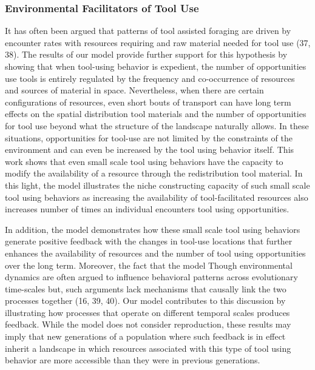 \documentclass[9pt,twocolumn,twoside,]{pnas-new}
\begin{document}
\hypertarget{environmental-facilitators-of-tool-use}{%
\subsubsection{Environmental Facilitators of Tool
Use}\label{environmental-facilitators-of-tool-use}}

It has often been argued that patterns of tool assisted foraging are
driven by encounter rates with resources requiring and raw material
needed for tool use (37, 38). The results of our model provide further
support for this hypothesis by showing that when tool-using behavior is
expedient, the number of opportunities use tools is entirely regulated
by the frequency and co-occurrence of resources and sources of material
in space. Nevertheless, when there are certain configurations of
resources, even short bouts of transport can have long term effects on
the spatial distribution tool materials and the number of opportunities
for tool use beyond what the structure of the landscape naturally
allows. In these situations, opportunities for tool-use are not limited
by the constraints of the environment and can even be increased by the
tool using behavior itself. This work shows that even small scale tool
using behaviors have the capacity to modify the availability of a
resource through the redistribution tool material. In this light, the
model illustrates the niche constructing capacity of such small scale
tool using behaviors as increasing the availability of tool-facilitated
resources also increases number of times an individual encounters tool
using opportunities.

\hspace{0pt} In addition, the model demonstrates how these small scale
tool using behaviors generate positive feedback with the changes in
tool-use locations that further enhances the availability of resources
and the number of tool using opportunities over the long term. Moreover,
the fact that the model Though environmental dynamics are often argued
to influence behavioral patterns across evolutionary time-scales but,
such arguments lack mechanisms that causally link the two processes
together (16, 39, 40). Our model contributes to this discussion by
illustrating how processes that operate on different temporal scales
produces feedback. While the model does not consider reproduction, these
results may imply that new generations of a population where such
feedback is in effect inherit a landscape in which resources associated
with this type of tool using behavior are more accessible than they were
in previous generations.
\end{document}
